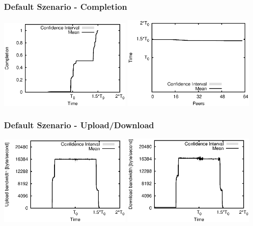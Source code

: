 \begin{frame}
  \frametitle{Default Szenario - Completion}
  \begin{center}
    \includegraphics[width=0.49\textwidth]{fig/plots/scenario_1_default/plots/GeneratedMeanChunkCompletion.csv.eps}
    \hfill
    \includegraphics[width=0.49\textwidth]{fig/plots/scenario_1_default/plots/GeneratedMeanSortedChunkCompletion.csv.eps}
  \end{center}
\end{frame}


\begin{frame}
  \frametitle{Default Szenario - Upload/Download}
  \begin{center}
    \includegraphics[width=0.49\textwidth]{fig/plots/scenario_1_default/plots/GeneratedMeanCurrentUploadBandwidth.csv.eps}
    \includegraphics[width=0.49\textwidth]{fig/plots/scenario_1_default/plots/GeneratedMeanCurrentDownloadBandwidth.csv.eps}
  \end{center}
\end{frame}


